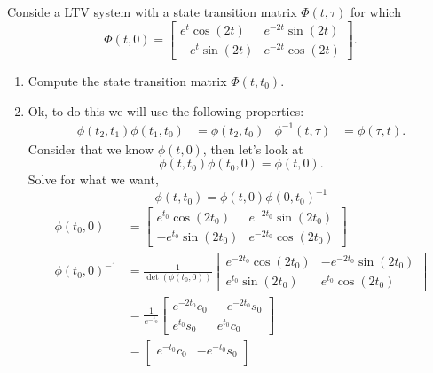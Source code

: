 \documentclass[10pt]{article}
\begin{document}
\section{}
Conside a LTV system with a state transition matrix $\Phi(t,\tau)$ for
which 
\begin{equation*}
  \Phi(t,0) =
  \begin{bmatrix}
    e^t\cos(2t) & e^{-2t}\sin(2t) \\ 
    -e^{t}\sin(2t) & e^{-2t}\cos(2t)
  \end{bmatrix}.
\end{equation*}
\begin{enumerate}[label=(\alph*)]
\item Compute the state transition matrix $\Phi(t,t_0)$.
\item[]
  Ok, to do this we will use the following properties:
  \begin{align}
    \phi(t_2, t_1)\phi(t_1,t_0) &= \phi(t_2, t_0)  & 
    \phi^{-1}(t,\tau) &= \phi(\tau, t).
  \end{align}
Consider that we know $\phi(t,0)$, then let's look at 
\begin{equation*}
  \phi(t,t_0)\phi(t_0,0) = \phi(t,0).
\end{equation*}
Solve for what we want,
\begin{equation*}
  \phi(t,t_0) = \phi(t,0)\phi(0,t_0)^{-1}
\end{equation*}
\begin{align*}
  \phi(t_0,0) & =
  \begin{bmatrix}
    e^{t_0}\cos(2t_0) & e^{-2t_0}\sin(2t_0) \\ 
    -e^{t_0}\sin(2t_0) & e^{-2t_0}\cos(2t_0)
  \end{bmatrix} \\
  \phi(t_0,0)^{-1} & =\frac{1}{\det\left(\phi(t_0,0)\right)}
  \begin{bmatrix}
    e^{-2t_0}\cos(2t_0) & -e^{-2t_0}\sin(2t_0) \\ 
    e^{t_0}\sin(2t_0) & e^{t_0}\cos(2t_0)
  \end{bmatrix} \\
  &=\frac{1}{e^{-t_0}}
  \begin{bmatrix}
    e^{-2t_0}c_0 & -e^{-2t_0}s_0 \\
    e^{t_0}s_0 & e^{t_0}c_0
  \end{bmatrix}\\
  &=
  \begin{bmatrix}
    e^{-t_0}c_0 & -e^{-t_0}s_0 \\

\end{bmatrix}
\end{align*}
\end{enumerate}
\end{document}
